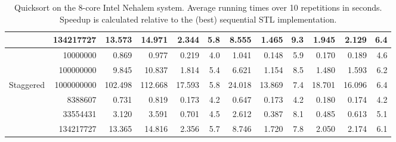 \documentclass[preprint]{sigplanconf}
\begin{document}
\begin{table*}[t!]
\begin{center}
\begin{tabular}{|lr|rr|rrr|rrr||rr|}
 & 134217727 & 13.573 & 14.971 & 2.344 & 5.8 & 8.555 & 1.465 & 9.3 & 1.945 & 2.129 & 6.4 \\
\hline
 & 10000000 & 0.869 & 0.977 & 0.219 & 4.0 & 1.041 & 0.148 & 5.9 & 0.170 & 0.189 & 4.6 \\
 & 100000000 & 9.845 & 10.837 & 1.814 & 5.4 & 6.621 & 1.154 & 8.5 & 1.480 & 1.593 & 6.2 \\
Staggered & 1000000000 & 102.498 & 112.668 & 17.593 & 5.8 & 24.018 & 13.869 & 7.4 & 18.701 & 16.096 & 6.4 \\
 & 8388607 & 0.731 & 0.819 & 0.173 & 4.2 & 0.647 & 0.173 & 4.2 & 0.180 & 0.174 & 4.2 \\
 & 33554431 & 3.120 & 3.591 & 0.701 & 4.5 & 2.612 & 0.387 & 8.1 & 0.485 & 0.613 & 5.1 \\
 & 134217727 & 13.365 & 14.816 & 2.356 & 5.7 & 8.746 & 1.720 & 7.8 & 2.050 & 2.174 & 6.1 \\

\hline
\end{tabular}
\end{center}
\caption{Quicksort on the 8-core Intel Nehalem system. 
Average running times over 10 repetitions in seconds. 
Speedup is calculated relative to the (best) sequential STL implementation.}
\label{tab:sort_cora_avg}
\end{table*}
\end{document}
